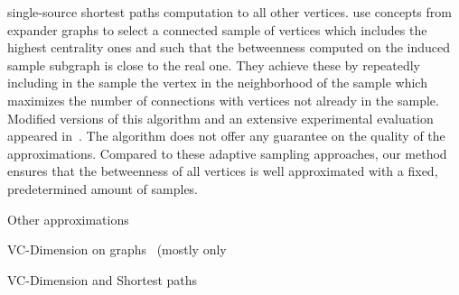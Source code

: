 single-source shortest paths computation to all other vertices.
\citet{MaiyaBW10} use concepts from expander graphs to select a connected sample
of vertices which includes the highest centrality ones and such that the
betweenness computed on the induced sample subgraph is close to the real one.
They achieve these by repeatedly including in the sample the vertex in the
neighborhood of the sample which maximizes the number of connections with
vertices not already in the sample.  Modified versions of this algorithm and an
extensive experimental evaluation appeared in~\citep{LimMRTB11}. The algorithm
does not offer any guarantee on the quality of the approximations. Compared to
these adaptive sampling approaches, our method ensures that the betweenness of
all vertices is well approximated with a fixed, predetermined amount of samples.

Other approximations~\citep{GkorouPE10,PrountzosP13,SaryuceSKC13}

VC-Dimension on graphs~\citep{AnthonyBC95,KranakisKRUW97,MubayiZ07,YcartR07}
(mostly only~\citep{KranakisKRUW97}

VC-Dimension and Shortest paths~\citep{AbrahamDFGW11}

